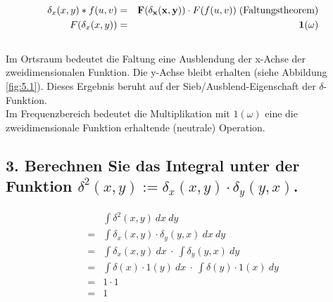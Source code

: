 \begin{eqnarray*}
\delta_{x}(x,y)*f(u,v) &=& \mathbf{F(\delta_{x}(x,y))}\cdot F(f(u,v)) \; \hbox{(Faltungstheorem)} \\
F(\delta_{x}(x,y)) &=& \mathbf{1(\omega)} \\
\end{eqnarray*}
\\
Im Ortsraum bedeutet die Faltung eine Ausblendung der x-Achse der zweidimensionalen Funktion. Die y-Achse bleibt erhalten (siehe Abbildung \ref{fig:5.1}). Dieses Ergebnis beruht auf der Sieb/Ausblend-Eigenschaft der $\delta$-Funktion. \\
Im Frequenzbereich bedeutet die Multiplikation mit $1(\omega)$ eine die zweidimensionale Funktion erhaltende (neutrale) Operation.

\subsection*{3. Berechnen Sie das Integral unter der Funktion $\delta^{2}(x,y):=\delta_{x}(x,y)\cdot\delta_{y}(y,x)$.}
\begin{align*}
& \int{\delta^{2}(x,y)~dx~dy}\\
= & \int{\delta_{x}(x,y)\cdot\delta_{y}(y,x)~dx~dy}\\
= & \int{\delta_{x}(x,y)~dx}~\cdot~\int{\delta_{y}(y,x)~dy}\\
= & \int{\delta(x) \cdot 1(y)~dx}~\cdot~\int{\delta(y) \cdot 1(x)~dy}\\
= & 1 \cdot 1\\
= & 1
\end{align*}

